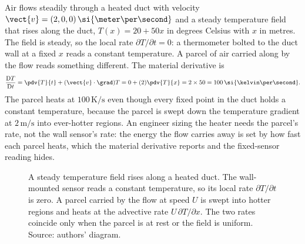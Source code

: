 \begin{example}
Air flows steadily through a heated duct with velocity $\vect{v} =
(2, 0, 0)\,\si{\meter\per\second}$ and a steady temperature field that
rises along the duct, $T(x) = 20 + 50x$ in degrees Celsius with $x$ in
metres. The field is steady, so the local rate $\partial T/\partial t
= 0$: a thermometer bolted to the duct wall at a fixed $x$ reads a
constant temperature. A parcel of air carried along by the flow reads
something different. The material derivative is
\[
\frac{\mathrm{D}T}{\mathrm{D}t} = \pdv{T}{t} + (\vect{v}\cdot\grad)T
= 0 + (2)\pdv{T}{x} = 2\times 50 = 100\,\si{\kelvin\per\second}.
\]
The parcel heats at $100\,\si{\kelvin\per\second}$ even though every
fixed point in the duct holds a constant temperature, because the
parcel is swept down the temperature gradient at $2\,\si{\meter\per
\second}$ into ever-hotter regions. An engineer sizing the heater
needs the parcel's rate, not the wall sensor's rate: the energy the
flow carries away is set by how fast each parcel heats, which the
material derivative reports and the fixed-sensor reading hides.
\end{example}

\begin{figure}[h]
  \centering
  
  \caption[Material derivative: fixed sensor versus moving parcel.]{A
  steady temperature field rises along a heated duct. The wall-mounted
  sensor reads a constant temperature, so its local rate
  $\partial T/\partial t$ is zero. A parcel carried by the flow at
  speed $U$ is swept into hotter regions and heats at the advective
  rate $U\,\partial T/\partial x$. The two rates coincide only when the
  parcel is at rest or the field is uniform. Source: authors' diagram.}
  \label{fig:vol02:ch08:material-derivative}
\end{figure}

